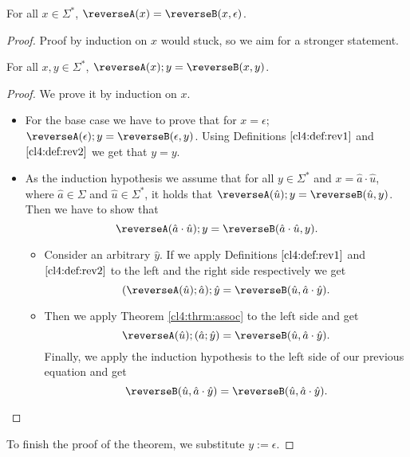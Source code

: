 \begin{theorem}
For all $x \in \Sigma^*$, $\reverseA(x) = \reverseB(x, \epsilon)$.
\end{theorem}

\begin{proof} Proof by induction on $x$ would stuck, so we aim for a stronger statement.

\begin{lemma}
For all $x, y \in \Sigma^*$, $\reverseA(x) ; y = \reverseB(x, y)$.
\end{lemma}
\begin{proof} We prove it by induction on $x$.
    \begin{itemize}
        \item For the base case we have to prove that for $x=\epsilon$; $\reverseA(\epsilon);y =\reverseB(\epsilon, y)$. Using Definitions $\ref{cl4:def:rev1}$ and $\ref{cl4:def:rev2}$ we get that $y=y$.
        \item As the induction hypothesis we assume that for all $y \in \Sigma^*$ and $x = \hat{a}\cdot \hat{u}$, where $\hat{a} \in \Sigma$ and $\hat{u}\in\Sigma^*$, it holds that $\reverseA(\hat{u}); y = \reverseB(\hat{u}, y)$. Then we have to show that 
        \begin{equation}
            \reverseA(\hat{a}\cdot \hat{u}); y = \reverseB(\hat{a}\cdot\hat{u}, y).
            \label{eq:rev_ind}
        \end{equation}
        \begin{itemize}
            \item Consider an arbitrary $\hat{y}$. If we apply Definitions $\ref{cl4:def:rev1}$ and $\ref{cl4:def:rev2}$ to the left and the right side respectively we get
            \begin{equation}
                (\reverseA(\hat{u}); \hat{a});\hat{y} = \reverseB(\hat{u}, \hat{a}\cdot \hat{y}).
            \end{equation}
            \item Then we apply Theorem \ref{cl4:thrm:assoc} to the left side and get
            \begin{equation}
                \reverseA(\hat{u}); (\hat{a}; \hat{y})= \reverseB(\hat{u}, \hat{a}\cdot \hat{y}).
            \end{equation}
            Finally, we apply the induction hypothesis to the left side of our previous equation and get
            \begin{equation}
                \reverseB(\hat{u}, \hat{a}\cdot \hat{y}) = \reverseB(\hat{u}, \hat{a}\cdot \hat{y}).
            \end{equation}
        \end{itemize}
    \end{itemize}
\end{proof}
To finish the proof of the theorem, we substitute $y := \epsilon$.
\end{proof}

